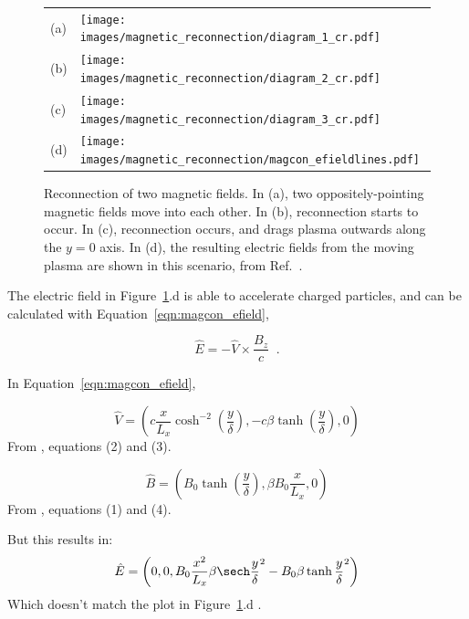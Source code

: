   \begin{figure}[ht]
    \centering
    \begin{tabular}{m{1cm}m{10cm}}
      (a) & \texttt{[image: images/magnetic\_reconnection/diagram\_1\_cr.pdf]} \\
      (b) & \texttt{[image: images/magnetic\_reconnection/diagram\_2\_cr.pdf]} \\
      (c) & \texttt{[image: images/magnetic\_reconnection/diagram\_3\_cr.pdf]} \\
      (d) & \texttt{[image: images/magnetic\_reconnection/magcon\_efieldlines.pdf]}
    \end{tabular}
    \caption[Magnetic Reconnection]{
      Reconnection of two magnetic fields.
      In (a), two oppositely-pointing magnetic fields move into each other.
      In (b), reconnection starts to occur.
      In (c), reconnection occurs, and drags plasma outwards along the $y=0$ axis.
      In (d), the resulting electric fields from the moving plasma are shown in this scenario, from Ref.~\cite{magcon_crab}.
    }
    \label{fig:magcon}
  \end{figure}
  
  The electric field in Figure~\ref{fig:magcon}.d is able to accelerate charged particles, and can be calculated with Equation~\ref{eqn:magcon_efield},
  
  \begin{equation}\label{eqn:magcon_efield}
    \hat{E} = -\hat{V} \times \frac{B_{z}}{c} \;\; .
  \end{equation}
  
  In Equation~\ref{eqn:magcon_efield}, 
  
  \begin{equation}
    \hat{V} = \left ( c \frac{x}{L_x} \cosh^{-2} \left ( \frac{y}{\delta} \right ),-c\beta \tanh \left ( \frac{y}{\delta} \right ), 0 \right )
  \end{equation}
  From \cite{magcon_crab}, equations (2) and (3).
  
  \begin{equation}
    \hat{B} = \left ( B_0 \tanh \left ( \frac{y}{\delta} \right ), \beta B_0 \frac{x}{L_x}, 0 \right )
  \end{equation}
  From \cite{magcon_crab}, equations (1) and (4).
  
  But this results in:
  \begin{equation}
    \hat{E} = \left (  0, 0, B_0 \frac{x^2}{L_x} \beta \sech \frac{y}{\delta}^2 - B_0 \beta \tanh \frac{y}{\delta}^2 \right )
  \end{equation}
  Which doesn't match the plot in Figure~\ref{fig:magcon}.d .
  
